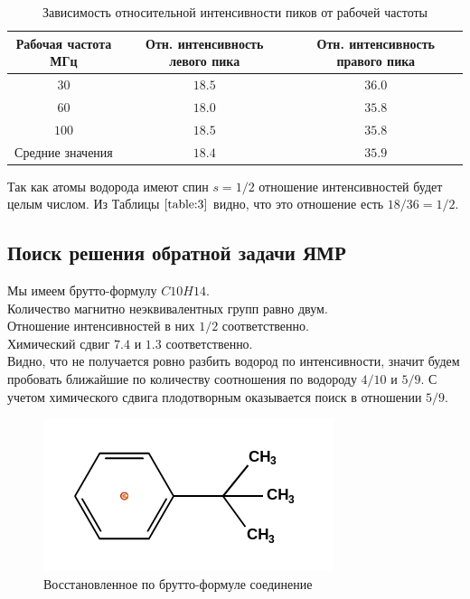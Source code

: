 \begin{table}[h!]
	\caption{Зависимость относительной интенсивности пиков от рабочей частоты}
	\label{table:3}
	\centering
	\begin{tabular}{|c|c|c|}
		\toprule
		Рабочая частота МГц & Отн. интенсивность левого пика & Отн. интенсивность правого пика    \\
		\midrule
		$30$  	& $18.5$  & $36.0$ \\
		$60$  	&  $18.0$ & $35.8$ \\ 
		$100$ 	& $ 18.5$ & $35.8$ \\
		Средние значения & $ 18.4$ & $35.9$ \\
		\bottomrule
	\end{tabular}
\end{table}

\newpage

Так как атомы водорода имеют спин $s = 1/2$ отношение интенсивностей будет целым числом. Из Таблицы $\ref{table:3}$ видно, что это отношение есть $18/36 = 1/2$. 

\subsection{Поиск решения обратной задачи ЯМР}


Мы имеем брутто-формулу $C10H14$.\\
Количество магнитно неэквивалентных групп равно двум.\\
Отношение интенсивностей в них $1/2$ соответственно.\\
Химический сдвиг $7.4$ и $1.3$ соответственно.\\

Видно, что не получается ровно разбить водород по интенсивности, значит будем пробовать ближайшие по количеству соотношения по водороду $4/10$ и $5/9$. С учетом химического сдвига плодотворным оказывается поиск в отношении $5/9$. 

\begin{figure}[h]
	\centering
	\includegraphics[width=0.6\linewidth]{pict4}
	\caption{Восстановленное по брутто-формуле соединение}
	\label{fig:pict4}
\end{figure}


